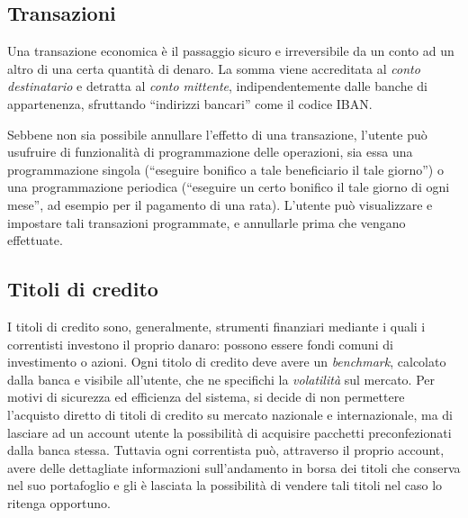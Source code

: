 \subsection{Transazioni}

Una transazione economica è il passaggio sicuro e irreversibile da un conto ad un altro di una certa quantità di denaro.
La somma viene accreditata al \emph{conto destinatario} e detratta al \emph{conto mittente}, indipendentemente dalle banche di appartenenza, sfruttando ``indirizzi bancari'' come il codice IBAN.

Sebbene non sia possibile annullare l'effetto di una transazione, l'utente pu\`o usufruire di funzionalit\`a di programmazione delle operazioni, sia essa una programmazione singola (``eseguire bonifico a tale beneficiario il tale giorno'') o una programmazione periodica (``eseguire un certo bonifico il tale giorno di ogni mese'', ad esempio per il pagamento di una rata).
L'utente pu\`o visualizzare e impostare tali transazioni programmate, e annullarle prima che vengano effettuate.


\subsection{Titoli di credito}

I titoli di credito sono, generalmente, strumenti finanziari mediante i quali i correntisti investono il proprio danaro: possono essere fondi comuni di investimento o azioni.
Ogni titolo di credito deve avere un \emph{benchmark}, calcolato dalla banca e visibile all'utente, che ne specifichi la \emph{volatilità} sul mercato.
Per motivi di sicurezza ed efficienza del sistema, si decide di non permettere l'acquisto diretto di titoli di credito su mercato nazionale e internazionale, ma di lasciare ad un account utente la possibilità di acquisire pacchetti preconfezionati dalla banca stessa.
Tuttavia ogni correntista può, attraverso il proprio account, avere delle dettagliate informazioni sull'andamento in borsa dei titoli che conserva nel suo portafoglio  e gli è lasciata la possibilità di vendere tali titoli nel caso lo ritenga opportuno.


